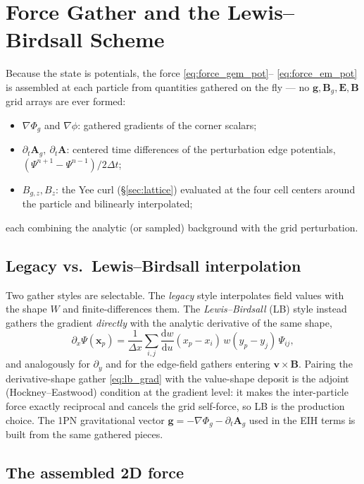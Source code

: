 \documentclass[11pt]{article}
\newcommand{\Phig}{\Phi_g}                 %
\newcommand{\Ag}{\mathbf{A}_g}             %
\newcommand{\vv}[1]{\mathbf{#1}}           %
\newcommand{\dd}{\mathrm{d}}               %
\newcommand{\dx}{\Delta x}                 %
\newcommand{\dt}{\Delta t}                 %
\newcommand{\Bg}{\vv{B}_g}
\begin{document}
\section{Force Gather and the Lewis--Birdsall Scheme}
\label{sec:gather}

Because the state is potentials, the force \eqref{eq:force_gem_pot}--%
\eqref{eq:force_em_pot} is assembled at each particle from quantities gathered
on the fly --- no $\vv g,\Bg,\vv E,\vv B$ grid arrays are ever formed:
\begin{itemize}\setlength\itemsep{1pt}
  \item $\nabla\Phig$ and $\nabla\phi$: gathered gradients of the corner scalars;
  \item $\partial_t\Ag,\ \partial_t\vv A$: centered time differences of the
  perturbation edge potentials, $(\Psi^{n+1}-\Psi^{n-1})/2\dt$;
  \item $B_{g,z},B_z$: the Yee curl (\S\ref{sec:lattice}) evaluated at the four
  cell centers around the particle and bilinearly interpolated;
\end{itemize}
each combining the analytic (or sampled) background with the grid perturbation.

\subsection{Legacy vs.\ Lewis--Birdsall interpolation}

Two gather styles are selectable. The \emph{legacy} style interpolates field
values with the shape $W$ and finite-differences them. The
\emph{Lewis--Birdsall} (LB) style instead gathers the gradient \emph{directly}
with the analytic derivative of the same shape,
\begin{equation}
\label{eq:lb_grad}
  \partial_x\Psi(\vv{x}_p) = \frac1{\dx}\sum_{i,j}
     \frac{\dd w}{\dd u}(x_p-x_i)\,w(y_p-y_j)\,\Psi_{ij},
\end{equation}
and analogously for $\partial_y$ and for the edge-field gathers entering
$\vv{v}\times\vv B$. Pairing the derivative-shape gather \eqref{eq:lb_grad} with
the value-shape deposit is the adjoint (Hockney--Eastwood) condition at the
gradient level: it makes the inter-particle force exactly reciprocal and cancels
the grid self-force, so LB is the production choice. The 1PN gravitational
vector $\vv g=-\nabla\Phig-\partial_t\Ag$ used in the EIH terms is built from the
same gathered pieces.

\subsection{The assembled 2D force}
\end{document}
